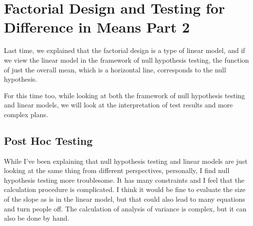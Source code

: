 \documentclass{ltjsarticle}
\begin{document}
\chapter{Factorial Design and Testing for Difference in Means Part 2}
\label{chapter22}
Last time, we explained that the factorial design is a type of linear model, and if we view the linear model in the framework of null hypothesis testing, the function of just the overall mean, which is a horizontal line, corresponds to the null hypothesis.

For this time too, while looking at both the framework of null hypothesis testing and linear models, we will look at the interpretation of test results and more complex plans.
\section{Post Hoc Testing}
While I've been explaining that null hypothesis testing and linear models are just looking at the same thing from different perspectives, personally, I find null hypothesis testing more troublesome. It has many constraints and I feel that the calculation procedure is complicated. I think it would be fine to evaluate the size of the slope as is in the linear model, but that could also lead to many equations and turn people off. The calculation of analysis of variance is complex, but it can also be done by hand.
\end{document}
